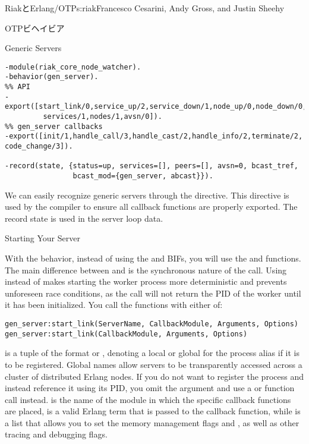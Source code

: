 \begin{aosachapter}{RiakとErlang/OTP}{s:riak}{Francesco Cesarini, Andy Gross, and Justin Sheehy}
\begin{aosasect1}{OTPビヘイビア}
\begin{aosasect2}{Generic Servers}
\begin{verbatim}
-module(riak_core_node_watcher).
-behavior(gen_server).
%% API
-export([start_link/0,service_up/2,service_down/1,node_up/0,node_down/0,services/0,
         services/1,nodes/1,avsn/0]).
%% gen_server callbacks
-export([init/1,handle_call/3,handle_cast/2,handle_info/2,terminate/2, code_change/3]).

-record(state, {status=up, services=[], peers=[], avsn=0, bcast_tref,
                bcast_mod={gen_server, abcast}}).
\end{verbatim}

We can easily recognize generic servers through the
 directive. This directive is used by
the compiler to ensure all callback functions are properly
exported. The record state is used in the server loop data.

\end{aosasect2}

\begin{aosasect2}{Starting Your Server}

With the  behavior, instead of using the
 and  BIFs, you will use the
 and 
functions. The main difference between  and 
is the synchronous nature of the call. Using  instead of
 makes starting the worker process more deterministic and
prevents unforeseen race conditions, as the call will not return the
PID of the worker until it has been initialized. You call the
functions with either of:

\begin{verbatim}
gen_server:start_link(ServerName, CallbackModule, Arguments, Options)
gen_server:start_link(CallbackModule, Arguments, Options)
\end{verbatim}

\noindent {} is a tuple of the format  or
, denoting a local or global  for the
process alias if it is to be registered. Global names allow servers
to be transparently accessed across a cluster of distributed Erlang
nodes. If you do not want to register the process and instead
reference it using its PID, you omit the argument and use a
 or  function call
instead.  is the name of the module in which
the specific callback functions are placed,  is a
valid Erlang term that is passed to the  callback
function, while  is a list that allows you to set the
memory management flags  and ,
as well as other tracing and debugging flags.


\end{aosasect2}
\end{aosasect1}
\end{aosachapter}
